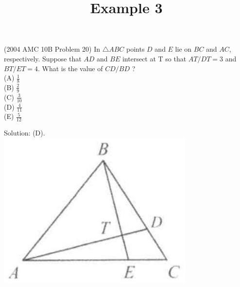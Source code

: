 \documentclass{article}
\title{Example 3}
\date{}
\begin{document}
\maketitle

(2004 AMC 10B Problem 20) In \(\triangle A B C\) points \(D\) and \(E\) lie on \(B C\) and \(A C\), respectively. Suppose that \(A D\) and \(B E\) intersect at T so that \(A T / D T=3\) and \(B T / E T=4\). What is the value of \(C D / B D\) ?\\
(A) \(\frac{1}{8}\)\\
(B) \(\frac{2}{9}\)\\
(C) \(\frac{3}{10}\)\\
(D) \(\frac{4}{11}\)\\
(E) \(\frac{5}{12}\)

Solution: (D).\\
\centering
\includegraphics[width=\textwidth]{images/104.jpg}
\end{document}
